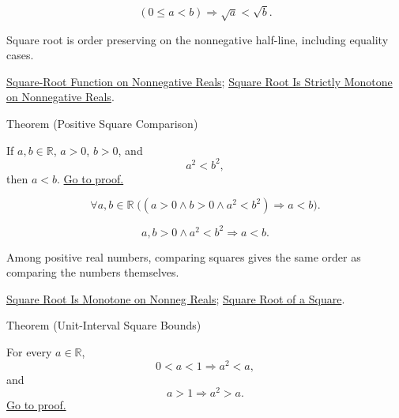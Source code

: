 \begin{remark*}
\[
(0\le a<b)\Rightarrow \sqrt{a}<\sqrt{b}.
\]
\end{remark*}

\begin{remark*}[Interpretation]
Square root is order preserving on the nonnegative half-line, including
equality cases.
\end{remark*}

\begin{dependencies}
\hyperref[def:real-square-root-function]{Square-Root Function on Nonnegative Reals};
\hyperref[thm:ineq-square-root-strict-monotone]{Square Root Is Strictly Monotone on Nonnegative Reals}.
\end{dependencies}

\begin{theorembox}{Theorem (Positive Square Comparison)}
\begin{theorem}
\label{thm:positive-square-comparison}
If $a,b\in\mathbb{R}$, $a>0$, $b>0$, and
\[
a^2<b^2,
\]
then $a<b$.
\hyperref[prf:positive-square-comparison]{Go to proof.}
\end{theorem}
\end{theorembox}

\begin{remark*}
\[
\forall a,b\in\mathbb{R}\;
\bigl((a>0\land b>0\land a^2<b^2)\Rightarrow a<b\bigr).
\]
\end{remark*}

\begin{remark*}
\[
a,b>0\land a^2<b^2\Rightarrow a<b.
\]
\end{remark*}

\begin{remark*}[Interpretation]
Among positive real numbers, comparing squares gives the same order as
comparing the numbers themselves.
\end{remark*}

\begin{dependencies}
\hyperref[thm:ineq-square-root-monotone]{Square Root Is Monotone on Nonneg Reals};
\hyperref[thm:sqrt-of-square-absolute-value]{Square Root of a Square}.
\end{dependencies}

\begin{theorembox}{Theorem (Unit-Interval Square Bounds)}
\begin{theorem}
\label{thm:unit-interval-square-bounds}
For every $a\in\mathbb{R}$,
\[
0<a<1\Rightarrow a^2<a,
\]
and
\[
a>1\Rightarrow a^2>a.
\]
\hyperref[prf:unit-interval-square-bounds]{Go to proof.}
\end{theorem}
\end{theorembox}


